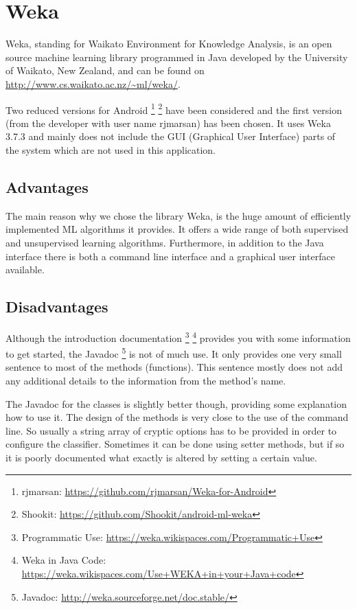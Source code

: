 
\section{Weka}
Weka, standing for Waikato Environment for Knowledge Analysis, is an open source machine learning library programmed in Java developed by the University of Waikato, New Zealand, and can be found on \url{http://www.cs.waikato.ac.nz/~ml/weka/}.

Two reduced versions for Android \footnote{rjmarsan: \url{https://github.com/rjmarsan/Weka-for-Android}} \footnote{Shookit: \url{https://github.com/Shookit/android-ml-weka}} have been considered and the first version (from the developer with user name rjmarsan) has been chosen. It uses Weka 3.7.3 and mainly does not include the GUI (Graphical User Interface) parts of the system which are not used in this application.

\subsection{Advantages}
The main reason why we chose the library Weka, is the huge amount of efficiently implemented ML algorithms it provides. It offers a wide range of both supervised and unsupervised learning algorithms. Furthermore, in addition to the Java interface there is both a command line interface and a graphical user interface available.

\subsection{Disadvantages}
Although the introduction documentation \footnote{Programmatic Use: \url{https://weka.wikispaces.com/Programmatic+Use}} \footnote{Weka in Java Code: \url{https://weka.wikispaces.com/Use+WEKA+in+your+Java+code}} provides you with some information to get started, the Javadoc \footnote{Javadoc: \url{http://weka.sourceforge.net/doc.stable/}} is not of much use. It only provides one very small sentence to most of the methods (functions). This sentence mostly does not add any additional details to the information from the method's name. 

The Javadoc for the classes is slightly better though, providing some explanation how to use it. The design of the methods is very close to the use of the command line. So usually a string array of cryptic options has to be provided in order to configure the classifier. Sometimes it can be done using setter methods, but if so it is poorly documented what exactly is altered by setting a certain value.

